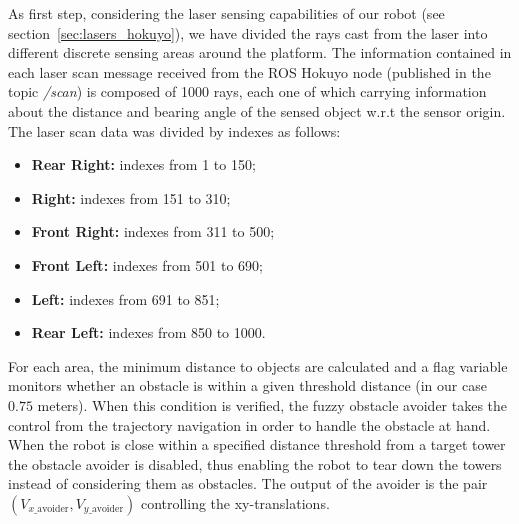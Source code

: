 As first step, considering the laser sensing capabilities of our robot (see section~\ref{sec:lasers_hokuyo}), we have divided the rays cast from the laser into different discrete sensing areas around the platform. The information  contained in each laser scan message received from the ROS Hokuyo node (published in the topic \textit{/scan}) is composed of 1000 rays, each one of which carrying information about the distance and bearing angle of the sensed object w.r.t the sensor origin. The laser scan data was divided by indexes as follows: %

\begin{itemize}
	\item \textbf{Rear Right:} indexes from 1 to 150;
	\item \textbf{Right:} indexes from 151 to 310;
	\item \textbf{Front Right:} indexes from 311 to 500;
	\item \textbf{Front Left:} indexes from 501 to 690;
	\item \textbf{Left:} indexes from 691 to 851;
	\item \textbf{Rear Left:} indexes from 850 to 1000.
\end{itemize}

For each area, the minimum distance to objects are calculated and a flag variable monitors whether an obstacle is within a given threshold distance (in our case $0.75$ meters). When this condition is verified, the fuzzy obstacle avoider takes the control from the trajectory navigation in order to handle the obstacle at hand. When the robot is close within a specified distance threshold from a target tower the obstacle avoider is disabled, thus enabling the robot to tear down the towers instead of considering them as obstacles. The output of the avoider is the pair $(V_{x\_\text{avoider}}, V_{y\_ \text{avoider}})$ controlling the xy-translations.%

